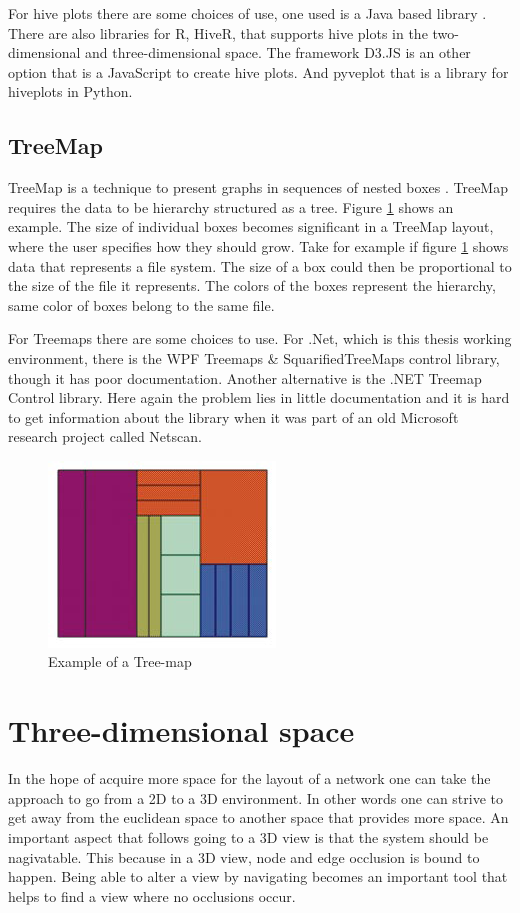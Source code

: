 \documentclass[a4paper,11pt]{kth-mag}
\begin{document}
For hive plots there are some choices of use, one used is a Java based library \cite{website:JHive}. There are also libraries for R\cite{website:R}, HiveR\cite{website:HiveR}, that supports hive plots in the two-dimensional and three-dimensional space.
The framework D3.JS\cite{website:D3JS} is an other option that is a JavaScript to create hive plots. And pyveplot\cite{website:pyveplot} that is a library for hiveplots in Python\cite{website:python}.
\subsection{TreeMap}
TreeMap is a technique to present graphs in sequences of nested boxes \cite{herman00}. TreeMap requires the data to be hierarchy structured as a tree. Figure \ref{fig:tree_map_ex} shows an example. The size of individual boxes becomes significant in 
a TreeMap layout, where the user specifies how they should grow. Take for example if figure \ref{fig:tree_map_ex} shows data that represents a file system. The size of a box could then be proportional to the size of the file it represents. The colors of the boxes 
represent the hierarchy, same color of boxes belong to the same file.

For Treemaps there are some choices to use. For .Net, which is this thesis working environment, there is the WPF Treemaps \& SquarifiedTreeMaps control library\cite{website:WPFTreeMaps}, though it has poor documentation.
 Another alternative is the .NET Treemap Control library\cite{website:devxTreeMap}. Here again the problem lies in little documentation and it is hard to get information about the library when it was part of an old Microsoft
 research project called Netscan.
\begin{figure}[!htbp]
	\centering
	\includegraphics{TreeMapEx}
	\caption{Example of a Tree-map}
	\label{fig:tree_map_ex}
\end{figure}
\newpage
\section{Three-dimensional space}
In the hope of acquire more space for the layout of a network one can take the approach to go from a 2D to a 3D environment. In other words one can strive to get away from the euclidean space to another space that provides more space.
 An important aspect that follows going to a 3D view is that the system should be nagivatable. This because in a 3D view, node and edge occlusion is bound to happen. Being able to alter a view by navigating becomes an important tool 
 that helps to find a view where no occlusions occur.
\end{document}
